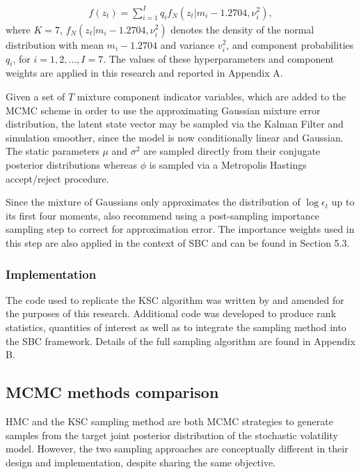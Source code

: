 \documentclass[12pt, a4paper]{article}
\begin{document}
        \begin{align}
        f(z_t) = \sum_{i=1}^{I} q_if_N(z_t|m_i-1.2704, \nu_i^2),
        \end{align}
        where $K=7$, $f_N(z_t|m_i-1.2704, \nu_i^2)$ denotes the density of the normal distribution with mean $m_i-1.2704$ and variance $v_i^2$, and  component probabilities $q_i$, for $i=1,2,\ldots, I=7$.  The values of these hyperparameters and component weights are applied in this research and reported in Appendix A.

        Given a set of $T$ mixture component indicator variables, which are added to the MCMC scheme in order to use the approximating Gaussian mixture error distribution, the latent state vector may be sampled via the Kalman Filter and simulation smoother, since the model is now conditionally linear and Gaussian. The static parameters $\mu$ and $\sigma^2$ are sampled directly from their conjugate posterior distributions whereas $\phi$ is sampled via a Metropolis Hastings accept/reject procedure.

        Since the mixture of Gaussians only approximates the distribution of $\log \epsilon_t$ up to its first four moments, \citet{kim1998stochastic} also recommend using a post-sampling importance sampling step to correct for approximation error. The importance weights used in this step are also applied in the context of SBC and can be found in Section 5.3. 
        
        \subsubsection*{Implementation}
        The code used to replicate the KSC algorithm was written by \citet{chad2018} and amended for the purposes of this research. Additional code was developed to produce rank statistics, quantities of interest as well as to integrate the sampling method into the SBC framework. Details of the full sampling algorithm are found in Appendix B. 

        
    \subsection{MCMC methods comparison}
        HMC and the KSC sampling method are both MCMC strategies to generate samples from the target joint posterior distribution of the stochastic volatility model. However, the two sampling approaches are conceptually different in their design and implementation, despite sharing the same objective.
\end{document}
